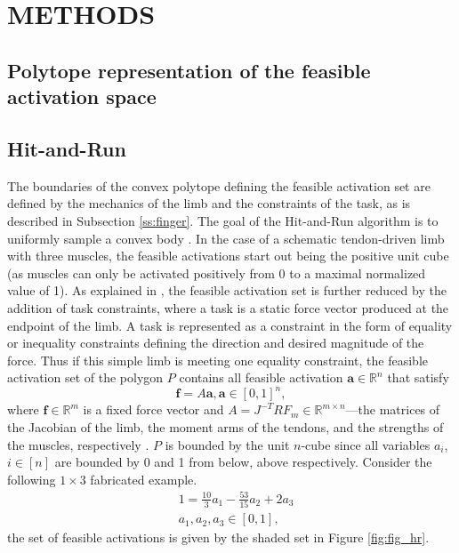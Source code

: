 \section{METHODS}

\subsection{Polytope representation of the feasible activation space}

\subsection{Hit-and-Run}
The boundaries of the convex polytope defining the feasible activation set are defined by the mechanics of the limb and the constraints of the task, as is described in Subsection \ref{ss:finger}. The goal of the Hit-and-Run algorithm is to uniformly sample  a convex body \cite{smith1984efficient}. 
In the case of a schematic tendon-driven limb with three muscles, the feasible activations start out being the positive unit cube (as muscles can only be activated positively from 0 to a maximal normalized value of 1). As explained in \cite{Valero-Cuevas2009mathematical}, the feasible activation set is further reduced by the addition of task constraints, where a task is a static force vector produced at the endpoint of the limb. A task is represented as a constraint in the form of equality or inequality constraints defining the direction and desired magnitude of the force. Thus if this simple limb is meeting one equality constraint, the feasible activation set of the polygon $P$ contains all feasible activation  $\textbf{a} \in \mathbb{R}^n$ that satisfy
\[\textbf{f} = A\textbf{a}, \textbf{a} \in [0,1]^n,\]
where $\textbf{f} \in \mathbb{R}^m$ is a fixed force vector and $A = J^{-T}RF_m \in \mathbb{R}^{m \times n}$---the matrices of the Jacobian of the limb, the moment arms of the tendons, and the strengths of the muscles, respectively \cite{Valero-Cuevas1998Large,Valero-Cuevas2009mathematical}. $P$ is bounded by the unit $n$-cube since all variables $a_i$, $i \in [n]$ are bounded by 0 and 1 from below, above respectively.
Consider the following $1 \times 3$ fabricated example.
\begin{align*}
&1 = \frac{10}{3}a_1 - \frac{53}{15}a_2 + 2a_3 \\
&a_1, a_2, a_3 \in [0,1],
\end{align*}
the set of feasible activations is given by the shaded set in Figure \ref{fig:fig_hr}.


